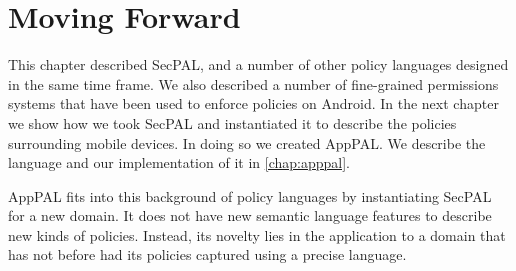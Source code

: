 \documentclass[thesis.tex]{subfiles}
\begin{document}
\section{Moving Forward}

This chapter described SecPAL, and a number of other policy languages designed
in the same time frame. We also described a number of fine-grained permissions
systems that have been used to enforce policies on Android. In the next chapter
we show how we took SecPAL and instantiated it to describe the policies
surrounding mobile devices. In doing so we created AppPAL. We describe the
language and our implementation of it in \autoref{chap:apppal}.

AppPAL fits into this background of policy languages by instantiating SecPAL
for a new domain. It does not have new semantic language features to describe
new kinds of policies.  Instead, its novelty lies in the application to a
domain that has not before had its policies captured using a precise language.
\end{document}
